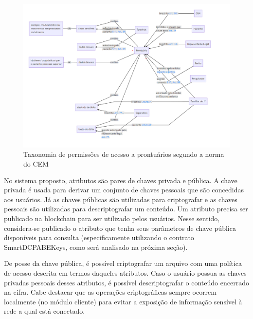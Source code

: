 \documentclass[a4paper,11pt]{article}
\begin{document}
\begin{figure}[h]
  \centering
  \includegraphics[width=\textwidth]{images/taxonomia-de-permissoes.png}
  \caption{Taxonomia de permissões de acesso a prontuários segundo a norma do CEM} %
  \label{fig:taxonomiaPermissoes}
\end{figure}


No sistema proposto, atributos são pares de chaves privada e pública.
A chave privada é usada para derivar um conjunto de chaves pessoais que são concedidas aos usuários.
Já as chaves públicas são utilizadas para criptografar e as chaves pessoais são utilizadas para descriptografar um conteúdo.
Um atributo precisa ser publicado na blockchain para ser utilizado pelos usuários.
Nesse sentido, considera-se publicado o atributo que tenha seus parâmetros de chave pública disponíveis para consulta (especificamente utilizando o contrato SmartDCPABEKeys, como será analisado na próxima seção).

De posse da chave pública, é possível criptografar um arquivo com uma política de acesso descrita em termos daqueles atributos. Caso o usuário possua as chaves privadas pessoais desses atributos, é possível descriptografar o conteúdo encerrado na cifra.
Cabe destacar que as operações criptográficas sempre ocorrem localmente {\color{blue}(no módulo cliente)} para evitar a exposição de informação sensível à rede a qual está conectado.
\end{document}
